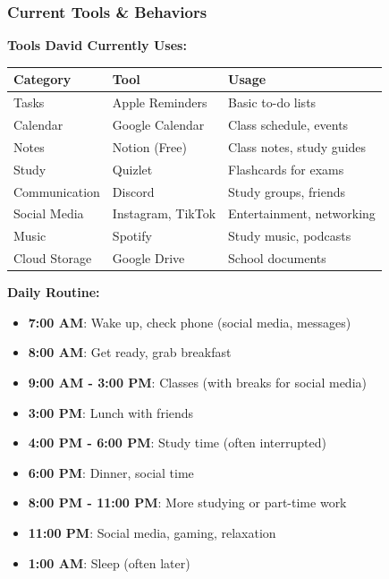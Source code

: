 \subsubsection{Current Tools \& Behaviors}

\textbf{Tools David Currently Uses:}

\begin{table}[H]
\centering
\begin{tabular}{|l|l|p{6cm}|}
\hline
\rowcolor{lightgray}
\textbf{Category} & \textbf{Tool} & \textbf{Usage} \\
\hline
Tasks & Apple Reminders & Basic to-do lists \\
\hline
Calendar & Google Calendar & Class schedule, events \\
\hline
Notes & Notion (Free) & Class notes, study guides \\
\hline
Study & Quizlet & Flashcards for exams \\
\hline
Communication & Discord & Study groups, friends \\
\hline
Social Media & Instagram, TikTok & Entertainment, networking \\
\hline
Music & Spotify & Study music, podcasts \\
\hline
Cloud Storage & Google Drive & School documents \\
\hline
\end{tabular}
\end{table}

\textbf{Daily Routine:}

\begin{itemize}
    \item \textbf{7:00 AM}: Wake up, check phone (social media, messages)
    \item \textbf{8:00 AM}: Get ready, grab breakfast
    \item \textbf{9:00 AM - 3:00 PM}: Classes (with breaks for social media)
    \item \textbf{3:00 PM}: Lunch with friends
    \item \textbf{4:00 PM - 6:00 PM}: Study time (often interrupted)
    \item \textbf{6:00 PM}: Dinner, social time
    \item \textbf{8:00 PM - 11:00 PM}: More studying or part-time work
    \item \textbf{11:00 PM}: Social media, gaming, relaxation
    \item \textbf{1:00 AM}: Sleep (often later)
\end{itemize}

